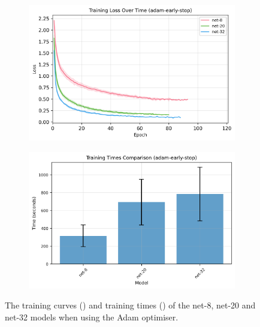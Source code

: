 \documentclass[logo,bsc,singlespacing,parskip,online]{infthesis}
\begin{document}
\begin{figure}[h]
   \centering
   \begin{subfigure}[b]{0.48\textwidth}
      \centering
      \includegraphics[width=\textwidth]{adam-early-stop_training_losses.png}
      \caption{}
      \label{fig:adam-optimiser-losses}
   \end{subfigure}
   \hfill
   \begin{subfigure}[b]{0.48\textwidth}
      \centering
      \includegraphics[width=\textwidth]{adam-early-stop_training_times.png}
      \caption{}
      \label{fig:adam-optimiser-times}
   \end{subfigure}
   \caption{The training curves () and training times () of the net-8, net-20 and net-32 models when using the Adam optimiser.}
\end{figure}
\end{document}

